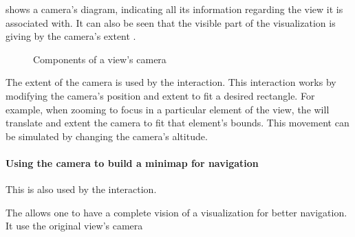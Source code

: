 \documentclass[a4paper,10pt,twoside]{book}
\begin{document}
 shows a camera's diagram, indicating all its information regarding the view it is associated with. It can also be seen that the visible part of the visualization is giving by the camera's extent .


\begin{figure}[H]
        \centering
		 \hfill
		\hfill
        \caption{Components of a view's camera}\label{fig:cameraDiagram}
\end{figure}

The extent of the camera is used by the  interaction. This interaction works by modifying the camera's position and extent to fit a desired rectangle. For example, when zooming to focus in a particular element of the view, the  will translate and extent the camera to fit that element's bounds.
This movement can be simulated by changing the camera's altitude.

\paragraph{Using the camera to build a minimap for navigation}
This is also used by the  interaction.

The  allows one to have a complete vision of a visualization for better navigation. It use the original view's camera 
\end{document}
